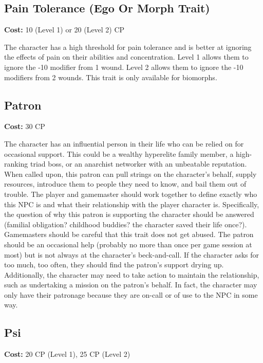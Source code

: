 \subsection{Pain Tolerance (Ego Or Morph Trait)}
\label{sec:traits-pain-tolerance}

\textbf{Cost:} 10 (Level 1) or 20 (Level 2) CP

The character has a high threshold for pain tolerance and is better at ignoring the effects of pain on their abilities and concentration. Level 1 allows them to ignore the -10 modifier from 1 wound. Level 2 allows them to ignore the -10 modifiers from 2 wounds. This trait is only available for biomorphs.

\subsection{Patron}
\label{sec:traits-patron}

\textbf{Cost:} 30 CP

The character has an influential person in their life who can be relied on for occasional support. This could be a wealthy hyperelite family member, a high-ranking triad boss, or an anarchist networker with an unbeatable reputation. When called upon, this patron can pull strings on the character’s behalf, supply resources, introduce them to people they need to know, and bail them out of trouble. The player and gamemaster should work together to define exactly who this NPC is and what their relationship with the player character is. Specifically, the question of why this patron is supporting the character should be answered (familial obligation? childhood buddies? the character saved their life once?). Gamemasters should be careful that this trait does not get abused. The patron should be an occasional help (probably no more than once per game session at most) but is not always at the character’s beck-and-call. If the character asks for too much, too often, they should find the patron’s support drying up. Additionally, the character may need to take action to maintain the relationship, such as undertaking a mission on the patron’s behalf. In fact, the character may only have their patronage because they are on-call or of use to the NPC in some way.

\subsection{Psi}
\label{sec:traits-psi}
\textbf{Cost:} 20 CP (Level 1), 25 CP (Level 2)

